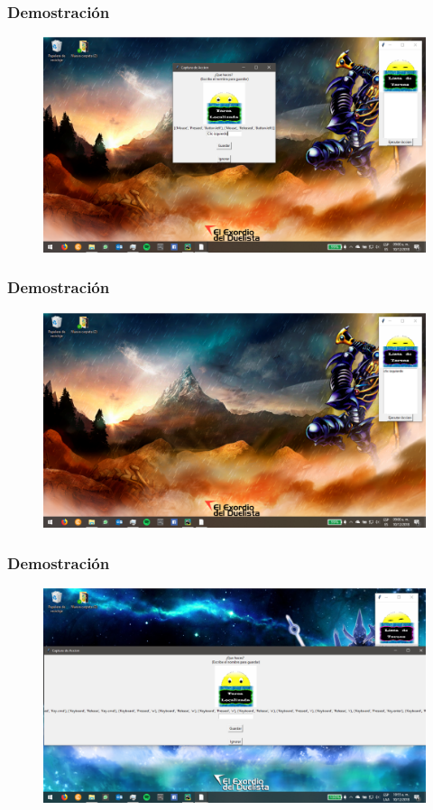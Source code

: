 \begin{frame}
\frametitle{Demostraci\'on}
\begin{figure}[H]
\centering
\includegraphics[width=1.0\columnwidth]{Imagenes/5.eps}
\end{figure}
\end{frame}

\begin{frame}
\frametitle{Demostraci\'on}
\begin{figure}[H]
\centering
\includegraphics[width=1.0\columnwidth]{Imagenes/6.eps}
\end{figure}
\end{frame}

\begin{frame}
\frametitle{Demostraci\'on}
\begin{figure}[H]
\centering
\includegraphics[width=1.0\columnwidth]{Imagenes/7.eps}
\end{figure}
\end{frame}


